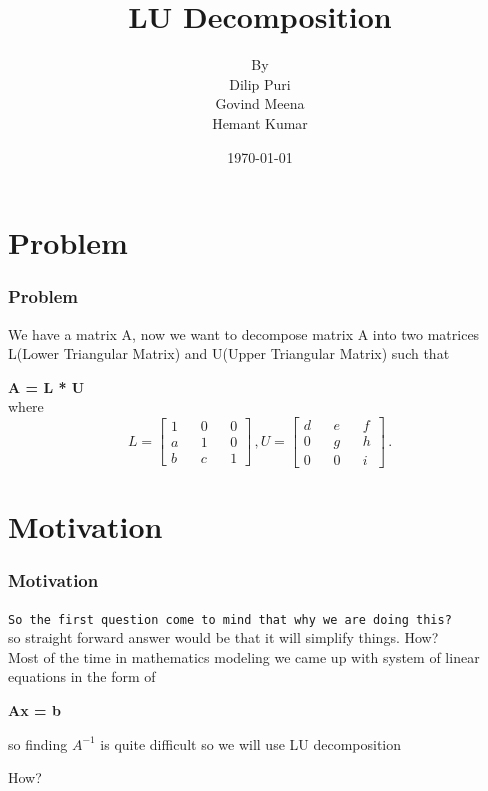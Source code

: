 \documentclass{beamer}
\begin{document}
\title{LU Decomposition}  
\author{By\\ Dilip Puri\\Govind Meena\\Hemant Kumar}
\date{\today} 
\begin{frame}
\titlepage
\end{frame}


\section{Problem} 
\begin{frame}\frametitle{Problem} 
We have a matrix A, now we want to decompose matrix A into two matrices L(Lower Triangular Matrix) and U(Upper Triangular Matrix) such that \\
\begin{center}
\begin{LARGE}
\textbf{A = L * U}\\
where
\begin{equation*}
L = \left[ \begin{aligned}
1 && 0 && 0 \\
a && 1 && 0 \\
b && c && 1
\end{aligned}
\right]\,,
U = \left[ \begin{aligned}
d && e && f \\
0 && g && h \\
0 && 0 && i
\end{aligned}
\right]\,.
\end{equation*}
\end{LARGE}
\end{center}
\end{frame}


\section{Motivation} 
\begin{frame}\frametitle{Motivation} 
\texttt{So the first question come to mind that why we are doing this?}\\
so straight forward answer would be that it will simplify things. How?\\
Most of the time in mathematics modeling we came up with system of linear equations in the form of\\
\begin{center}
\begin{LARGE}
\textbf{Ax = b}
\end{LARGE}
\end{center}
so finding $A^{-1}$ is quite difficult so we will use LU decomposition\\
\begin{center} \begin{huge}
How?
\end{huge} \end{center}
\end{frame}
\end{document}
